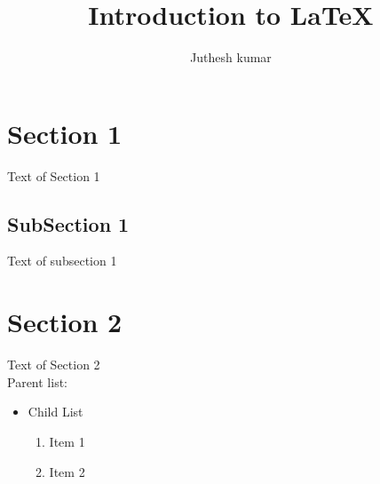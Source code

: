 \documentclass{article}
\begin{document}
	\title{Introduction to \LaTeX{}}
	\author{Juthesh kumar}

	\maketitle

	\tableofcontents

	\section{Section 1}
	{\selectfont \Large Text of Section 1}
	\subsection{SubSection 1}
	Text of subsection 1
	\section{Section 2}
	{\selectfont \Huge Text of Section 2}
	\\Parent list:
	\begin{itemize}
		\item Child List
		\begin{enumerate}
			\item Item 1
			\item Item 2
		\end{enumerate}
	\end{itemize}
\end{document}
